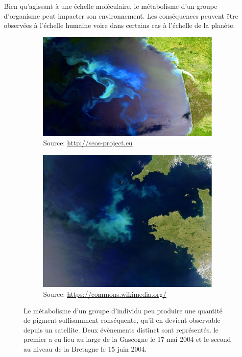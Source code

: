 \begin{refsection}
    Bien qu'agissant à une échelle moléculaire, le métabolisme d'un groupe d'organisme peut impacter son environnement. Les conséquences peuvent être observées à l'échelle humaine voire dans certains cas à l'échelle de la planète.
    \begin{figure}[h]
        \begin{subfigure}[b]{.5\textwidth}
            \centering
            \includegraphics[width=\textwidth]{img/bloom_gascogne.jpg}
            \caption{{\tiny Source: \url{http://seos-project.eu}}}
            \label{fig:bloom_gascogne}
        \end{subfigure}
        \hfill
        \begin{subfigure}[b]{.5\textwidth}
            \centering
            \includegraphics[width=\textwidth]{img/bloom_bretagne.jpg}
            \caption{{\tiny Source: \url{https://commons.wikimedia.org/}}}
            \label{fig:bloom_bretagne}
        \end{subfigure}
    \caption{Le métabolisme d'un groupe d'individu peu produire une quantité de pigment suffisamment conséquente, qu'il en devient observable depuis un satellite. Deux évènements distinct sont représentés. le premier a eu lieu au large de la Gascogne le 17 mai 2004 et le second au niveau de la Bretagne le 15 juin 2004.}
    \label{fig:bloom}
    \end{figure}


\end{refsection}
